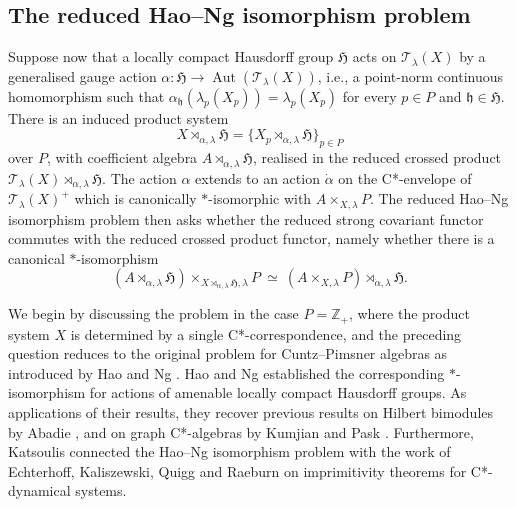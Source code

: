 \documentclass[11pt,final]{amsart}
\numberwithin{equation}{section}
\theoremstyle{plain}
\theoremstyle{definition}
\theoremstyle{remark}
\newcommand{\T}{{\mathcal{T}}}
\def\al{\alpha}
\def\la{\lambda}
\newcommand{\fH}{{\mathfrak{H}}}
\newcommand{\fh}{{\mathfrak{h}}}
\newcommand{\Aut}{\operatorname{Aut}}
\begin{document}
\subsection{The reduced Hao--Ng isomorphism problem}
Suppose now that a locally compact Hausdorff group \(\fH\) acts on $\T_\la(X)$ by a generalised gauge action
$\al\colon\fH\to\Aut(\T_\la(X))$, i.e., a point-norm continuous homomorphism such that $\al_\fh(\la_p(X_p))=\la_p(X_p)$ for every $p\in P$ and
$\fh\in\fH$.  There is an induced product system
\[
X\rtimes_{\al,\la}\fH
=
\{X_p\rtimes_{\al,\la}\fH\}_{p\in P}
\]
over $P$, with coefficient algebra
\(A\rtimes_{\al,\la}\fH\), realised in the reduced crossed product $\T_\la(X)\rtimes_{\al,\la}\fH$. The action $\al$ extends to an action $\dot\al$ on the C*-envelope of $\T_\la(X)^+$ which is canonically $*$-isomorphic with
$A\times_{X,\la}P$.  The reduced Hao--Ng isomorphism problem then asks whether the reduced strong covariant functor commutes with the
reduced crossed product functor, namely whether there is a
canonical $*$-isomorphism
\[
(A\rtimes_{\al,\la}\fH)
\times_{X\rtimes_{\al,\la}\fH,\la}P
\ \simeq\
(A\times_{X,\la}P)
\rtimes_{\dot\al,\la}\fH.
\]

We begin by discussing the problem in the case $P=\mathbb Z_+$, where the product system $X$ is determined by a single C*-correspondence, and the preceding question reduces to the original problem for Cuntz--Pimsner algebras as introduced by Hao and Ng \cite{HN08}.
Hao and Ng \cite{HN08} established the corresponding $*$-isomorphism for actions of
amenable locally compact Hausdorff groups. As applications of their results, they recover previous results on Hilbert bimodules by Abadie \cite{Aba10}, and on graph C*-algebras by Kumjian and Pask \cite{KP99}.
Furthermore, Katsoulis \cite{Kat17} connected the Hao--Ng isomorphism problem with the work of Echterhoff, Kaliszewski, Quigg and Raeburn \cite{EKQR06} on imprimitivity theorems for C*-dynamical systems.
\end{document}
